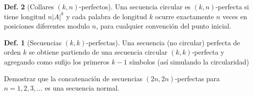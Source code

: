 \documentclass{article}
\theoremstyle{definition} %
\newtheorem{definition}{Def.}
\begin{document}
\begin{definition}[Collares $(k, n)$-perfectos] Una secuencia circular es $(k,
n)$-perfecta si tiene longitud $n |A|^k$ y cada palabra de longitud $k$ ocurre
exactamente $n$ veces en posiciones diferentes modulo $n$, para cualquier
convención del punto inicial.

\begin{definition}[Secuencias $(k, k)$-perfectas] Una secuencia (no circular)
perfecta de orden $k$ se obtiene partiendo de una secuencia circular $(k,
k)$-perfecta y agregando como sufijo los primeros $k-1$ símbolos (así simulando
la circularidad)
\end{definition}
    
\end{definition}

Demostrar que la concatenación de secuencias $(2n, 2n)$-perfectas para
$n = 1, 2, 3, \dots$ es una secuencia normal.
\end{document}
